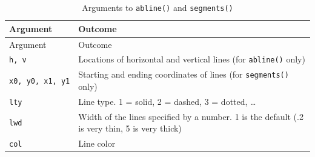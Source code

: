 \documentclass[]{book}
\theoremstyle{definition}
\theoremstyle{definition}
\theoremstyle{remark}
\begin{document}
\begin{longtable}[]{@{}ll@{}}
\caption{\label{tab:linearguments} Arguments to \texttt{abline()} and
\texttt{segments()}}\tabularnewline
\toprule
\begin{minipage}[b]{0.14\columnwidth}\raggedright\strut
Argument\strut
\end{minipage} & \begin{minipage}[b]{0.50\columnwidth}\raggedright\strut
Outcome\strut
\end{minipage}\tabularnewline
\midrule
\endfirsthead
\toprule
\begin{minipage}[b]{0.14\columnwidth}\raggedright\strut
Argument\strut
\end{minipage} & \begin{minipage}[b]{0.50\columnwidth}\raggedright\strut
Outcome\strut
\end{minipage}\tabularnewline
\midrule
\endhead
\begin{minipage}[t]{0.14\columnwidth}\raggedright\strut
\texttt{h,\ v}\strut
\end{minipage} & \begin{minipage}[t]{0.50\columnwidth}\raggedright\strut
Locations of horizontal and vertical lines (for \texttt{abline()}
only)\strut
\end{minipage}\tabularnewline
\begin{minipage}[t]{0.14\columnwidth}\raggedright\strut
\texttt{x0,\ y0,\ x1,\ y1}\strut
\end{minipage} & \begin{minipage}[t]{0.50\columnwidth}\raggedright\strut
Starting and ending coordinates of lines (for \texttt{segments()}
only)\strut
\end{minipage}\tabularnewline
\begin{minipage}[t]{0.14\columnwidth}\raggedright\strut
\texttt{lty}\strut
\end{minipage} & \begin{minipage}[t]{0.50\columnwidth}\raggedright\strut
Line type. 1 = solid, 2 = dashed, 3 = dotted, \ldots{}\strut
\end{minipage}\tabularnewline
\begin{minipage}[t]{0.14\columnwidth}\raggedright\strut
\texttt{lwd}\strut
\end{minipage} & \begin{minipage}[t]{0.50\columnwidth}\raggedright\strut
Width of the lines specified by a number. 1 is the default (.2 is very
thin, 5 is very thick)\strut
\end{minipage}\tabularnewline
\begin{minipage}[t]{0.14\columnwidth}\raggedright\strut
\texttt{col}\strut
\end{minipage} & \begin{minipage}[t]{0.50\columnwidth}\raggedright\strut
Line color\strut
\end{minipage}\tabularnewline
\bottomrule
\end{longtable}
\end{document}
